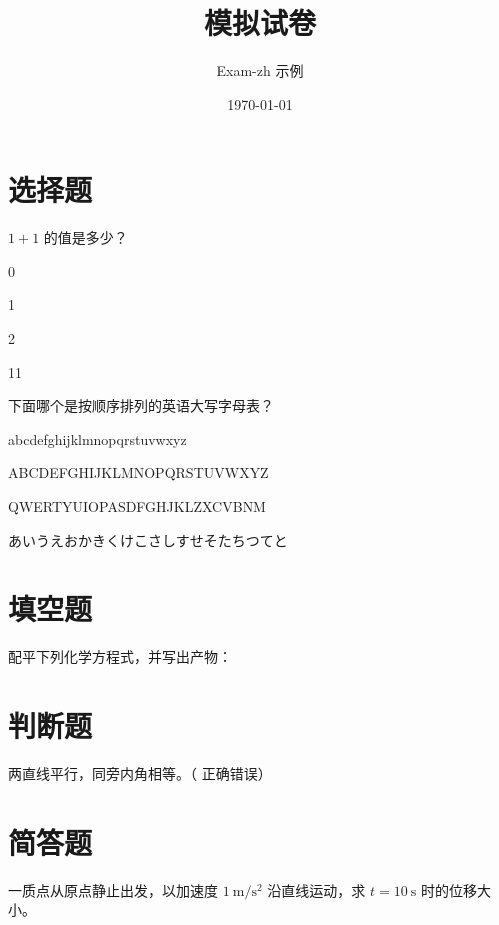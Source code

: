 \documentclass{exam-zh}
\title{模拟试卷}
\author{Exam-zh 示例}
\date{\today}
\begin{document}
\maketitle

\section{选择题}

	\begin{question}
		$1+1$ 的值是多少？
		\begin{choices}
			\item 0
			\item 1
			\item 2
			\item 11
		\end{choices}
	\end{question}

	\begin{question}
		下面哪个是按顺序排列的英语大写字母表？
		\begin{choices}
			\item abcdefghijklmnopqrstuvwxyz
			\item ABCDEFGHIJKLMNOPQRSTUVWXYZ
			\item QWERTYUIOPASDFGHJKLZXCVBNM
			\item あいうえおかきくけこさしすせそたちつてと
		\end{choices}
	\end{question}

\section{填空题}

\begin{question}
	配平下列化学方程式，并写出产物：\\
	 \fillin   %
\end{question}

\section{判断题}
	\begin{question}
		两直线平行，同旁内角相等。\hfill （ \quad 正确\quad 错误\quad ）
	\end{question}

\section{简答题}
	\begin{question}
		一质点从原点静止出发，以加速度 $\SI{1}{\meter\per\square\second}$ 沿直线运动，求 $t = \SI{10}{\second}$ 时的位移大小。
		\vspace{4cm}   %
	\end{question}
\end{document}
